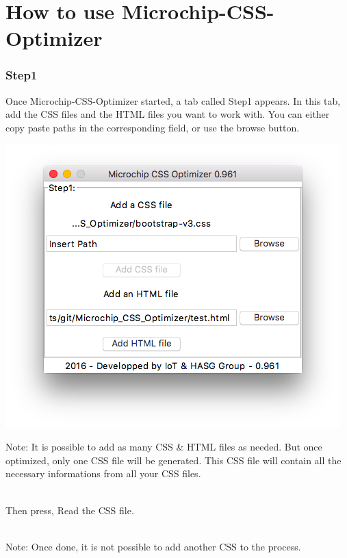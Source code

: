 \documentclass[10pt,letterpaper]{article}
\begin{document}
\part {How to use Microchip-CSS-Optimizer}
\setcounter{section}{0}
\section {Step1}

Once Microchip-CSS-Optimizer started, a tab called Step1 appears. In this tab, add the CSS files and the HTML files you want to work with. You can either copy paste paths in the corresponding field, or use the browse button.\\
\begin{center} 
\includegraphics[scale=0.4]{step1}
\end{center}
\begin{itshape}
Note: It is possible to add as many CSS \& HTML files as needed. But once optimized, only one CSS file will be generated. This CSS file will contain all the necessary informations from all your CSS files.\\
\end{itshape}
\\Then press, Read the CSS file.\\
\begin{itshape}
\\Note: Once done, it is not possible to add another CSS to the process.\\
\end{itshape}
\end{document}
